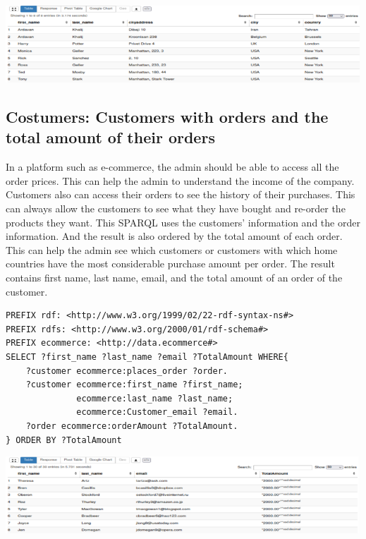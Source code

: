 \documentclass{article}
\begin{document}
\begin{center}
   \includegraphics[scale=0.6]{OISreport-costumer-query.png}
\end{center}

\subsection{Costumers: Customers with orders and the total amount of their orders}
In a platform such as e-commerce, the admin should be able to access all the order prices. This can help the admin to understand the income of the company. Customers also can access their orders to see the history of their purchases. This can always allow the customers to see what they have bought and re-order the products they want. This SPARQL uses the customers' information and the order information. And the result is also ordered by the total amount of each order. This can help the admin see which customers or customers with which home countries have the most considerable purchase amount per order. The result contains first name, last name, email, and the total amount of an order of the customer.

\begin{lstlisting}[breaklines, frame=single]
PREFIX rdf: <http://www.w3.org/1999/02/22-rdf-syntax-ns#>
PREFIX rdfs: <http://www.w3.org/2000/01/rdf-schema#>
PREFIX ecommerce: <http://data.ecommerce#>
SELECT ?first_name ?last_name ?email ?TotalAmount WHERE{
	?customer ecommerce:places_order ?order.
	?customer ecommerce:first_name ?first_name;
			  ecommerce:last_name ?last_name;
			  ecommerce:Customer_email ?email.
	?order ecommerce:orderAmount ?TotalAmount.
} ORDER BY ?TotalAmount
\end{lstlisting}

\begin{center}
   \includegraphics[scale=0.6]{OISreport-costumer-query2.png}
\end{center}
\end{document}
